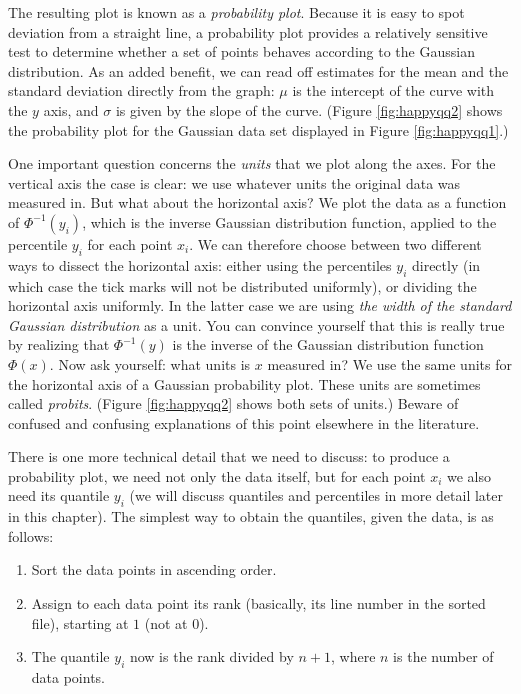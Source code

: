 The resulting plot is known as a \emph{probability plot}. Because it
is easy to spot deviation from a straight line, a probability plot
provides a relatively sensitive test to determine whether a set of
points behaves according to the Gaussian distribution. As an added
benefit, we can read off estimates for the mean and the standard
deviation directly from the graph: $\mu$ is the intercept of the curve
with the $y$ axis, and $\sigma$ is given by the slope of the curve.
(Figure \ref{fig:happyqq2} shows the probability plot for the Gaussian
data set displayed in Figure \ref{fig:happyqq1}.)

One important question concerns the \emph{units} that we plot along
the axes. For the vertical axis the case is clear: we use whatever
units the original data was measured in. But what about the horizontal
axis? We plot the data as a function of $\Phi^{-1}(y_i)$, which is the
inverse Gaussian distribution function, applied to the percentile
$y_i$ for each point $x_i$. We can therefore choose between two
different ways to dissect the horizontal axis: either using the
percentiles $y_i$ directly (in which case the tick marks will not be
distributed uniformly), or dividing the horizontal axis uniformly. In
the latter case we are using \emph{the width of the standard Gaussian
  distribution} as a unit. You can convince yourself that this is
really true by realizing that $\Phi^{-1}(y)$ is the inverse of the
Gaussian distribution function $\Phi(x)$. Now ask yourself: what units
is $x$ measured in? We use the same units for the horizontal axis of a
Gaussian probability plot.  These units are sometimes called
\emph{probits}. (Figure \ref{fig:happyqq2} shows both sets of units.)
Beware of confused and confusing explanations of this point elsewhere
in the literature.

There is one more technical detail that we need to discuss: to produce
a probability plot, we need not only the data itself, but for each
point $x_i$ we also need its quantile $y_i$ (we will discuss
quantiles and percentiles in more detail later in this chapter). The
simplest way to obtain the quantiles, given the data, is as follows:

\begin{enumerate}
\item Sort the data points in ascending order.
\item Assign to each data point its rank (basically, its line number
  in the sorted file), starting at $1$ (not at $0$).
\item The quantile $y_i$ now is the rank divided by $n+1$, where
  $n$ is the number of data points.
\end{enumerate}

